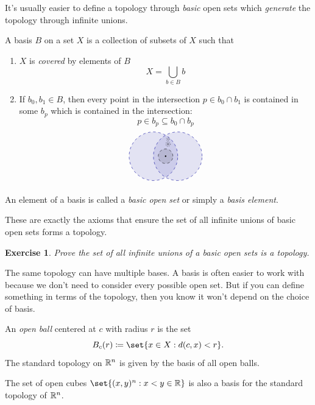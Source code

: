 \documentclass[a5paper]{scrbook}
\newcounter{exercisectr}
\newtheorem{exercise}[exercisectr]{Exercise}
\begin{document}
  It's usually easier to define a topology through \emph{basic} open sets which \emph{generate} the topology through infinite unions. 
  \begin{defn}
    A basis \(B\) on a set \(X\) is a collection of subsets of \(X\) such that
    \begin{enumerate}
      \item \(X\) is \emph{covered} by elements of \(B\)
            \[
            X = \bigcup_{b\in B} b
            \]
      \item If \(b_0,b_1\in B\), then every point in the intersection \(p\in b_0\cap b_1\) is contained in some \(b_p\) which is contained in the intersection:
            \[
            p\in b_p \subseteq b_0\cap b_p
            \]
            \[
            \begin{tikzpicture}
              \filldraw[dashed,  color=blue!60!black, fill opacity=.1] (0,0) circle (1);
              \filldraw[dashed,  color=blue!60!black,fill opacity=.1] 
              (1,0) circle (1);
              \fill (.5,0) circle (.03);
              \filldraw[dashed, fill opacity=.1] (.5,0) circle (.3);
              \fill (.6,.5) circle (.02);
              \filldraw[dotted,fill opacity=.1] (.6,.5) circle (.1);
              \fill (.6,.7) circle (.01);
              \filldraw[dotted, fill opacity=.1] (.6,.7) circle (.07);
            \end{tikzpicture}
            \]
    \end{enumerate}
    An element of a basis is called a \emph{basic open set} or simply a \emph{basis element}. 
  \end{defn}
  These are exactly the axioms that ensure the set of all infinite unions of basic open sets forms a topology. 
  \begin{exercise}
    Prove the set of all infinite unions of a basic open sets is a topology. 
  \end{exercise}

  The same topology can have multiple bases. A basis is often easier to work with because we don't need to consider every possible open set. But if you can define something in terms of the topology, then you know it won't depend on the choice of basis. 
  \begin{example}
    An \emph{open ball} centered at \(c\) with radius \(r\) is the set
    \[
      B_c(r) \define \set{x\in X : d(c,x) < r}.
    \]
    The standard topology on \(\mathbb{R}^n\) is given by the basis of all open balls. 
  \end{example}
  The set of open cubes \(\set{(x,y)^n : x < y \in \R}\) is also a basis for the standard topology of \(\mathbb{R}^n\). 
\end{document}
